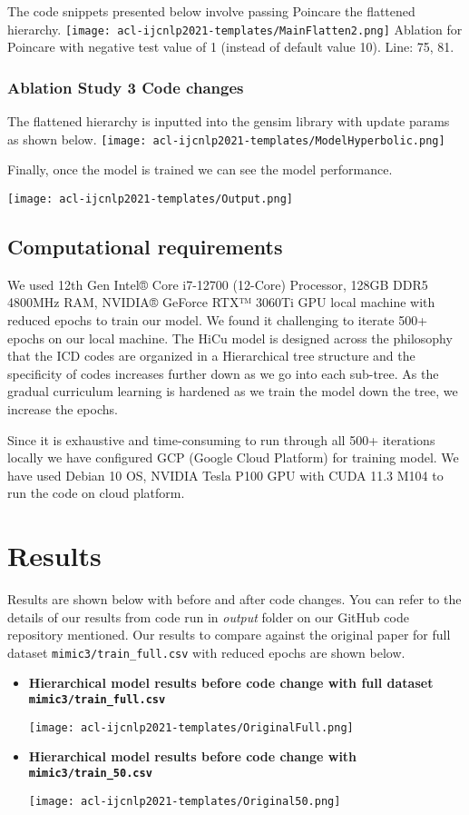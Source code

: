 \documentclass[11pt,a4paper]{article}
\begin{document}
The code snippets presented below involve passing Poincare the flattened hierarchy.
\texttt{[image: acl-ijcnlp2021-templates/MainFlatten2.png]}
Ablation for Poincare with negative test value of 1 (instead of default value 10). Line: 75, 81.

\subsubsection{Ablation Study 3 Code changes}
The flattened hierarchy is inputted into the gensim library with update params as shown below.
\texttt{[image: acl-ijcnlp2021-templates/ModelHyperbolic.png]}

Finally, once the model is trained we can see the model performance.

\begin{flushleft}\texttt{[image: acl-ijcnlp2021-templates/Output.png]}\end{flushleft}

\subsection{Computational requirements}
We used 12th Gen Intel® Core i7-12700 (12-Core) Processor, 128GB DDR5 4800MHz RAM, NVIDIA® GeForce RTX™ 3060Ti GPU local machine with reduced epochs to train our model. We found it challenging to iterate 500+ epochs on our local machine. The HiCu model is designed across the philosophy that the ICD codes are organized in a Hierarchical tree structure and the specificity of codes increases further down as we go into each sub-tree. As the gradual curriculum learning is hardened as we train the model down the tree, we increase the epochs.

Since it is exhaustive and time-consuming to run through all 500+ iterations locally we have configured GCP (Google Cloud Platform) for training model. We have used Debian 10 OS, NVIDIA Tesla P100 GPU with CUDA 11.3 M104 to run the code on cloud platform.

\section{Results}
Results are shown below with before and after code changes.
You can refer to the details of our results from code run in \textit{output} folder on our GitHub code repository mentioned.
Our results to compare against the original paper for full dataset \texttt{mimic3/train\_full.csv} with reduced epochs are shown below.
\begin{itemize}
    \item \textbf{Hierarchical model results before code change with full dataset \texttt{mimic3/train\_full.csv}}
    
    \texttt{[image: acl-ijcnlp2021-templates/OriginalFull.png]}
    \item \textbf{Hierarchical model results before code change with \texttt{mimic3/train\_50.csv}}
    
    \texttt{[image: acl-ijcnlp2021-templates/Original50.png]}
\end{itemize}
\end{document}

